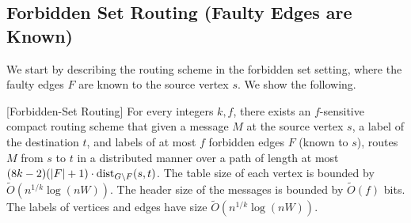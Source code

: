 \subsection{Forbidden Set Routing (Faulty Edges are Known)}\label{sec:routing-known}
We start by describing the routing scheme in the forbidden set setting, where the faulty edges $F$ are known to the source vertex $s$. We show the following.

\begin{theorem}\label{thm:routing-known}[Forbidden-Set Routing]
For every integers $k,f$, there exists an $f$-sensitive compact routing scheme that given a message $M$ at the source vertex $s$, a label of the destination $t$, and labels of at most $f$ forbidden edges $F$ (known to $s$), routes $M$ from $s$ to $t$ in a distributed manner over a path of length at most $(8k-2)(|F|+1)\cdot \mbox{\rm dist}_{G \setminus F}(s,t)$. The table size of each vertex is bounded by $\widetilde{O}(n^{1/k} \log{(nW)})$. The header size of the messages is bounded by $\widetilde{O}(f)$ bits. The labels of vertices and edges have size $\widetilde{O}(n^{1/k} \log(nW))$.
\end{theorem}

